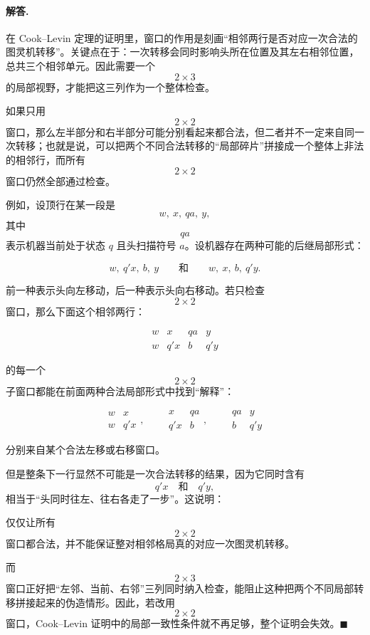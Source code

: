 \begin{answerred}
\paragraph{解答.}
在 Cook--Levin 定理的证明里，窗口的作用是刻画“相邻两行是否对应一次合法的图灵机转移”。关键点在于：一次转移会同时影响头所在位置及其左右相邻位置，总共三个相邻单元。因此需要一个
\[
2\times 3
\]
的局部视野，才能把这三列作为一个整体检查。

\medskip
如果只用
\[
2\times 2
\]
窗口，那么左半部分和右半部分可能分别看起来都合法，但二者并不一定来自同一次转移；也就是说，可以把两个不同合法转移的“局部碎片”拼接成一个整体上非法的相邻行，而所有
\[
2\times 2
\]
窗口仍然全部通过检查。

\medskip
例如，设顶行在某一段是
\[
w,\ x,\ qa,\ y,
\]
其中
\[
qa
\]
表示机器当前处于状态 $q$ 且头扫描符号 $a$。设机器存在两种可能的后继局部形式：

\[
w,\ q'x,\ b,\ y
\qquad\text{和}\qquad
w,\ x,\ b,\ q'y.
\]

前一种表示头向左移动，后一种表示头向右移动。若只检查
\[
2\times 2
\]
窗口，那么下面这个相邻两行：

\[
\begin{array}{cccc}
w & x & qa & y\\
w & q'x & b & q'y
\end{array}
\]

的每一个
\[
2\times 2
\]
子窗口都能在前面两种合法局部形式中找到“解释”：

\[
\begin{array}{cc}
w & x\\
w & q'x
\end{array},
\qquad
\begin{array}{cc}
x & qa\\
q'x & b
\end{array},
\qquad
\begin{array}{cc}
qa & y\\
b & q'y
\end{array}
\]

分别来自某个合法左移或右移窗口。

\medskip
但是整条下一行显然不可能是一次合法转移的结果，因为它同时含有
\[
q'x
\quad\text{和}\quad
q'y,
\]
相当于“头同时往左、往右各走了一步”。这说明：

\begin{center}
仅仅让所有
\[
2\times 2
\]
窗口都合法，并不能保证整对相邻格局真的对应一次图灵机转移。
\end{center}

而
\[
2\times 3
\]
窗口正好把“左邻、当前、右邻”三列同时纳入检查，能阻止这种把两个不同局部转移拼接起来的伪造情形。因此，若改用
\[
2\times 2
\]
窗口，Cook--Levin 证明中的局部一致性条件就不再足够，整个证明会失效。$\blacksquare$

\end{answerred}
